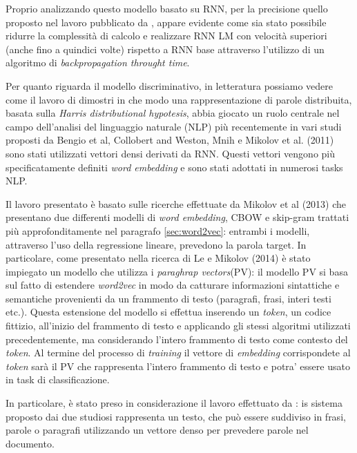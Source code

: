 \documentclass[a4paper,12pt,openright,twoside]{report}
\theoremstyle{definition}
\begin{document}
Proprio analizzando questo modello basato su RNN, per la precisione quello
proposto nel lavoro pubblicato da \cite{MikRNN}, appare evidente come sia
stato possibile ridurre la complessità  di calcolo e realizzare RNN LM con
velocità superiori (anche fino a quindici volte) rispetto a RNN base attraverso l'utilizzo
di un algoritmo di \emph{backpropagation throught time}.

Per quanto riguarda il modello discriminativo, in letteratura possiamo vedere come il lavoro di \cite{Baroni2010}
dimostri in che modo una rappresentazione di parole distribuita, 
basata sulla \emph{Harris distributional hypotesis},
abbia giocato un ruolo centrale nel campo dell'analisi del linguaggio naturale (NLP)
più recentemente in vari studi proposti da 
Bengio et al, Collobert and Weston, Mnih e Mikolov et al. (2011) %
sono stati utilizzati vettori densi derivati da RNN. Questi vettori vengono più specificatamente
definiti \emph{word embedding} e sono stati adottati in numerosi tasks NLP.

Il lavoro presentato è basato sulle ricerche effettuate da Mikolov et al (2013) %
che presentano due differenti modelli di \emph{word embedding}, CBOW e 
skip-gram trattati più approfonditamente nel paragrafo \ref{sec:word2vec}:
entrambi i modelli,
attraverso l'uso della regressione lineare, prevedono la parola target.
In particolare, come presentato nella ricerca di Le e Mikolov (2014)%
è stato impiegato
un modello che utilizza i \emph{paraghrap vectors}(PV): il modello PV si basa sul fatto
di estendere \emph{word2vec} in modo da catturare informazioni sintattiche e semantiche 
provenienti da un frammento di testo (paragrafi, frasi, interi testi etc.).
Questa estensione del modello si effettua inserendo un \emph{token}, un codice fittizio,
all'inizio del frammento di testo e applicando gli stessi algoritmi utilizzati 
precedentemente, ma considerando l'intero frammento di testo come contesto del \emph{token}.
Al termine del processo di \emph{training} il vettore di \emph{embedding} corrispondete
al \emph{token} sarà il PV che rappresenta l'intero frammento di testo e potra'
essere usato in task di classificazione.

In particolare, è stato preso in considerazione il lavoro effettuato da \cite{Mik2014}:
is sistema proposto dai due studiosi rappresenta un testo, che può essere suddiviso in
frasi, parole o paragrafi utilizzando un vettore denso per prevedere parole nel documento.

\end{document}
